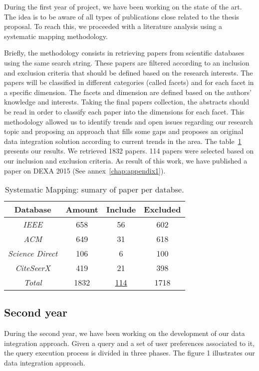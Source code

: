 During the first year of project, we have been working on the state of the art. The idea is to be aware of all types of publications close related to the thesis proposal. To reach this, we proceeded with a literature analysis using a systematic mapping methodology. 
	
Briefly, the methodology consists in retrieving papers from scientific databases using the same search string. 
These papers are filtered according to an inclusion and exclusion criteria that should be defined based on the research interests. 
The papers will be classified in different categories (called facets) and for each facet in a specific dimension. 
The facets and dimension are defined based on the authors' knowledge and interests. 
Taking the final papers collection, the abstracts should be read in order to classify each paper into the dimensions for each facet. 
This methodology allowed us to identify trends and open issues regarding our research topic and proposing an approach that fills some gaps and proposes an original data integration solution according to current trends in the area.
The table~\ref{table:sysmap} presents our results. We retrieved 1832 papers. 114 papers were selected based on our inclusion and exclusion criteria.
As result of this work, we have published a paper on DEXA 2015 (See annex~\ref{chap:appendix1}).

\begin{table}
\center
\begin{tabular}{|c|c|c|c|}
\hline 
\textbf{Database} & \textbf{Amount} & \textbf{Include} & \textbf{Excluded} \\ 
\hline 
\textit{IEEE} & 658 & 56 & 602 \\ 
\hline 
\textit{ACM} & 649 & 31 & 618 \\ 
\hline 
\textit{Science Direct} & 106 & 6 & 100 \\ 
\hline 
\textit{CiteSeerX} & 419 & 21 & 398 \\ 
\hline 
\textit{Total} & 1832 & \underline{114} & 1718 \\ 
\hline 
\end{tabular} 
\caption{Systematic Mapping: sumary of paper per databse.}\label{table:sysmap}
\end{table} 

\subsection{Second year}

During the second year, we have been working on the development of our data integration approach. Given a query and a set of user preferences associated to it, the query execution process is divided in three phases. The figure 1 illustrates our data integration approach.

